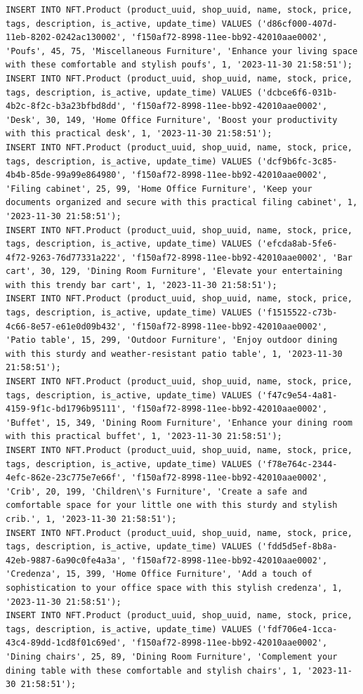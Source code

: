 \documentclass[a4paper, 12pt]{article}
\begin{document}
\begin{lstlisting}
INSERT INTO NFT.Product (product_uuid, shop_uuid, name, stock, price, tags, description, is_active, update_time) VALUES ('d86cf000-407d-11eb-8202-0242ac130002', 'f150af72-8998-11ee-bb92-42010aae0002', 'Poufs', 45, 75, 'Miscellaneous Furniture', 'Enhance your living space with these comfortable and stylish poufs', 1, '2023-11-30 21:58:51');
INSERT INTO NFT.Product (product_uuid, shop_uuid, name, stock, price, tags, description, is_active, update_time) VALUES ('dcbce6f6-031b-4b2c-8f2c-b3a23bfbd8dd', 'f150af72-8998-11ee-bb92-42010aae0002', 'Desk', 30, 149, 'Home Office Furniture', 'Boost your productivity with this practical desk', 1, '2023-11-30 21:58:51');
INSERT INTO NFT.Product (product_uuid, shop_uuid, name, stock, price, tags, description, is_active, update_time) VALUES ('dcf9b6fc-3c85-4b4b-85de-99a99e864980', 'f150af72-8998-11ee-bb92-42010aae0002', 'Filing cabinet', 25, 99, 'Home Office Furniture', 'Keep your documents organized and secure with this practical filing cabinet', 1, '2023-11-30 21:58:51');
INSERT INTO NFT.Product (product_uuid, shop_uuid, name, stock, price, tags, description, is_active, update_time) VALUES ('efcda8ab-5fe6-4f72-9263-76d77331a222', 'f150af72-8998-11ee-bb92-42010aae0002', 'Bar cart', 30, 129, 'Dining Room Furniture', 'Elevate your entertaining with this trendy bar cart', 1, '2023-11-30 21:58:51');
INSERT INTO NFT.Product (product_uuid, shop_uuid, name, stock, price, tags, description, is_active, update_time) VALUES ('f1515522-c73b-4c66-8e57-e61e0d09b432', 'f150af72-8998-11ee-bb92-42010aae0002', 'Patio table', 15, 299, 'Outdoor Furniture', 'Enjoy outdoor dining with this sturdy and weather-resistant patio table', 1, '2023-11-30 21:58:51');
INSERT INTO NFT.Product (product_uuid, shop_uuid, name, stock, price, tags, description, is_active, update_time) VALUES ('f47c9e54-4a81-4159-9f1c-bd1796b95111', 'f150af72-8998-11ee-bb92-42010aae0002', 'Buffet', 15, 349, 'Dining Room Furniture', 'Enhance your dining room with this practical buffet', 1, '2023-11-30 21:58:51');
INSERT INTO NFT.Product (product_uuid, shop_uuid, name, stock, price, tags, description, is_active, update_time) VALUES ('f78e764c-2344-4efc-862e-23c775e7e66f', 'f150af72-8998-11ee-bb92-42010aae0002', 'Crib', 20, 199, 'Children\'s Furniture', 'Create a safe and comfortable space for your little one with this sturdy and stylish crib.', 1, '2023-11-30 21:58:51');
INSERT INTO NFT.Product (product_uuid, shop_uuid, name, stock, price, tags, description, is_active, update_time) VALUES ('fdd5d5ef-8b8a-42eb-9887-6a90c0fe4a3a', 'f150af72-8998-11ee-bb92-42010aae0002', 'Credenza', 15, 399, 'Home Office Furniture', 'Add a touch of sophistication to your office space with this stylish credenza', 1, '2023-11-30 21:58:51');
INSERT INTO NFT.Product (product_uuid, shop_uuid, name, stock, price, tags, description, is_active, update_time) VALUES ('fdf706e4-1cca-43c4-89dd-1cd8f01c69ed', 'f150af72-8998-11ee-bb92-42010aae0002', 'Dining chairs', 25, 89, 'Dining Room Furniture', 'Complement your dining table with these comfortable and stylish chairs', 1, '2023-11-30 21:58:51');



\end{lstlisting}
\end{document}

